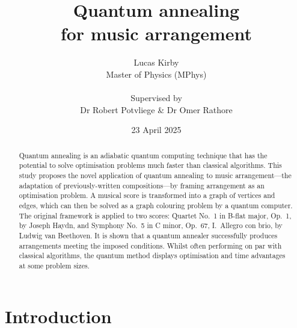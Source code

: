 \documentclass[12pt]{article}
\title{\Huge \bfseries Quantum annealing\\for music arrangement}
\author{Lucas Kirby\\\normalsize Master of Physics (MPhys)\\\\\normalsize Supervised by\\\normalsize Dr Robert Potvliege \& Dr Omer Rathore}
\date{\normalsize 23 April 2025}
\theoremstyle{definition}
\begin{document}
\maketitle

\vfill

\begin{center}
\begin{abstract}              

Quantum annealing is an adiabatic quantum computing technique that has the potential to solve optimisation problems much faster than classical algorithms. This study proposes the novel application of quantum annealing to music arrangement---the adaptation of previously-written compositions---by framing arrangement as an optimisation problem. A musical score is transformed into a graph of vertices and edges, which can then be solved as a graph colouring problem by a quantum computer. The original framework is applied to two scores: Quartet No.\ 1 in B-flat major, Op.\ 1, by Joseph Haydn, and Symphony No.\ 5 in C minor, Op.\ 67, I.\ Allegro con brio, by Ludwig van Beethoven. It is shown that a quantum annealer successfully produces arrangements meeting the imposed conditions. Whilst often performing on par with classical algorithms, the quantum method displays optimisation and time advantages at some problem sizes.

\end{abstract}

\vfill



\end{center}

\thispagestyle{empty}
\clearpage

\tableofcontents

\thispagestyle{empty}
\clearpage

\section{Introduction}
\end{document}
